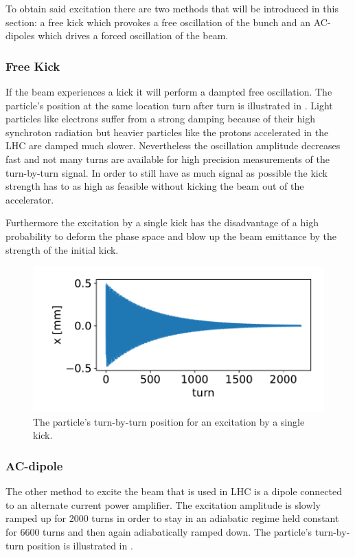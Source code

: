 To obtain said excitation there are two methods that will be introduced in this section: a free kick
which provokes a free oscillation of the bunch and an AC-dipoles which drives a forced oscillation of
the beam. 

\subsubsection{Free Kick}

If the beam experiences a kick it will perform a dampted free oscillation.
The particle's position at the same location turn after turn is illustrated in .
Light particles like electrons
suffer from a strong damping because of their high synchroton radiation but heavier particles like the
protons accelerated in the LHC are damped much slower.
Nevertheless the oscillation amplitude decreases fast and not many turns are available for high
precision measurements of the turn-by-turn signal. In order to still have as much signal as possible
the kick strength has to as high as feasible without kicking the beam out of the accelerator.

Furthermore the excitation by a single kick has the disadvantage of a high probability to deform the
phase space and blow up the beam emittance by the strength of the initial kick. 
%
\begin{figure}[h]
    \centering
    \includegraphics[width=.8\linewidth]{kick_plot.pdf}  
    \caption{The particle's turn-by-turn position for an excitation by a single kick.}
    \label{fig_kick_plot}
\end{figure}
%
\subsubsection{AC-dipole}

The other method to excite the beam that is used in LHC is a dipole connected to an alternate current
power amplifier. The excitation amplitude is slowly ramped up for 2000 turns in order to stay in an
adiabatic regime held constant for 6600 turns and then again adiabatically ramped down.
The particle's turn-by-turn position is illustrated in .

